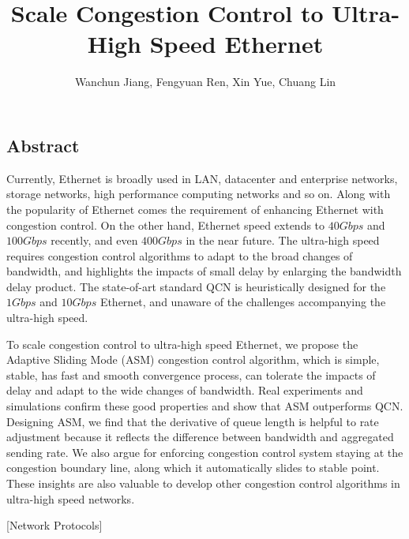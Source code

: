 \documentclass{sig-alternate-10pt}
\begin{document}
\title{Scale Congestion Control to Ultra-High Speed Ethernet}


\author{Wanchun Jiang, Fengyuan Ren, Xin Yue, Chuang Lin}


\maketitle

\thispagestyle{empty}
\makeatletter
\newcommand{\rmnum}[1]{\romannumeral #1}
\newcommand{\Rmnum}[1]{\expandafter\@slowromancap\romannumeral #1@}
\makeatother



\subsection*{Abstract}
Currently, Ethernet is broadly used in LAN, datacenter and enterprise networks, storage networks, high performance computing networks and so on. Along with the popularity of Ethernet comes the requirement of enhancing Ethernet with congestion control. On the other hand, Ethernet speed extends to $40Gbps$ and $100Gbps$ recently, and even $400Gbps$ in the near future. The ultra-high speed requires congestion control algorithms to adapt to the broad changes of bandwidth, and highlights the impacts of small delay by enlarging the bandwidth delay product. The state-of-art standard QCN is heuristically designed for the $1Gbps$ and $10Gbps$ Ethernet, and unaware of the challenges accompanying the ultra-high speed. 

To scale congestion control to ultra-high speed Ethernet, we propose the Adaptive Sliding Mode (ASM) congestion control algorithm, which is simple, stable, has fast and smooth convergence process, can tolerate the impacts of delay and adapt to the wide changes of bandwidth. Real experiments and simulations confirm these good properties and show that ASM outperforms QCN. Designing ASM, we find that the derivative of queue length is helpful to rate adjustment because it reflects the difference between bandwidth and aggregated sending rate. We also argue for enforcing congestion control system staying at the congestion boundary line, along which it automatically slides to stable point. These insights are also valuable to develop other congestion control algorithms in ultra-high speed networks. 

[Network Protocols] 
\end{document}
